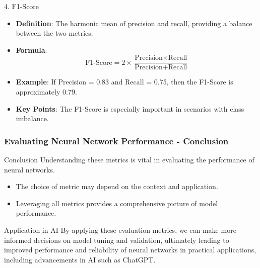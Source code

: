 \documentclass[aspectratio=169]{beamer}
\begin{document}
\begin{frame}[fragile]
    \begin{block}{4. F1-Score}
        \begin{itemize}
            \item \textbf{Definition}: The harmonic mean of precision and recall, providing a balance between the two metrics.
            \item \textbf{Formula}:
            \begin{equation}
                \text{F1-Score} = 2 \times \frac{\text{Precision} \times \text{Recall}}{\text{Precision} + \text{Recall}}
            \end{equation}
            \item \textbf{Example}: If Precision = 0.83 and Recall = 0.75, then the F1-Score is approximately 0.79.
            \item \textbf{Key Points}: The F1-Score is especially important in scenarios with class imbalance.
        \end{itemize}
    \end{block}
\end{frame}

\begin{frame}[fragile]
    \frametitle{Evaluating Neural Network Performance - Conclusion}
    \begin{block}{Conclusion}
        Understanding these metrics is vital in evaluating the performance of neural networks. 
        \begin{itemize}
            \item The choice of metric may depend on the context and application.
            \item Leveraging all metrics provides a comprehensive picture of model performance.
        \end{itemize}
    \end{block}
    
    \begin{block}{Application in AI}
        By applying these evaluation metrics, we can make more informed decisions on model tuning and validation, ultimately leading to improved performance and reliability of neural networks in practical applications, including advancements in AI such as ChatGPT.
    \end{block}
\end{frame}
\end{document}
